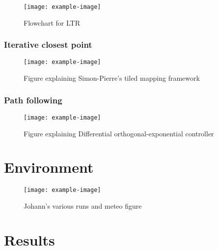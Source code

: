 \documentclass{article}
\begin{document}
\begin{figure} [htpb]
	\centering
	\texttt{[image: example-image]}
	\caption{Flowchart for LTR}
	\label{fig:ltr_flow}
\end{figure}

\subsubsection{Iterative closest point}
\label{ICP}

\lightlipsum[1]

\begin{figure} [htpb]
	\centering
	\texttt{[image: example-image]}
	\caption{Figure explaining Simon-Pierre's tiled mapping framework}
	\label{fig:tiled_map}
\end{figure}

\subsubsection{Path following}
\label{sec:orthexp}

\lightlipsum[1]

\begin{figure} [htpb]
	\centering
	\texttt{[image: example-image]}
	\caption{Figure explaining Differential orthogonal-exponential controller}
	\label{fig:diff_orthexp}
\end{figure}

\section{Environment}
\label{sec:env}

\lightlipsum[1]

\begin{figure} [htpb]
	\centering
	\texttt{[image: example-image]}
	\caption{Johann's various runs and meteo figure}
	\label{fig:meteo_runs}
\end{figure}

\lightlipsum[1]

\section{Results}
\label{sec:results}

\lightlipsum[1]
\end{document}
